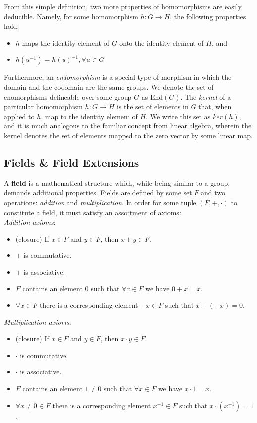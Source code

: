 From this simple definition, two more properties of homomorphisms are easily deducible. Namely, for some homomorphism $h: G \rightarrow H$, the following properties hold:
\begin{itemize}
\item $h$ maps the identity element of $G$ onto the identity element of $H$, and
\item $h(u^{-1}) = h(u)^{-1}, \forall u \in G$
\end{itemize}

Furthermore, an \emph{endomorphism} is a special type of morphism in which the domain and the codomain are the same groups. We denote the set of enomorphisms defineable over some group $G$ as $\text{End}(G)$.
The \emph{kernel} of a particular homomorphism $h: G \rightarrow H$  is the set of elements in $G$ that, when applied to $h$, map to the identity element of $H$. We write this set as $ker(h)$, and it is much analogous to the familiar concept from linear algebra, wherein the kernel denotes the set of elements mapped to the zero vector by some linear map.
\vspace{10mm}

\subsection{Fields \& Field Extensions}

A \textbf{field} is a mathematical structure which, while being similar to a group, demands additional properties. Fields are defined by some set $F$ and two operations: \emph{addition} and \emph{multiplication}. In order for some tuple $(F,+,\cdot)$ to constitute a field, it must satisfy an assortment of axioms:\\

\emph{Addition axioms}:
\begin{itemize}
\item (closure) If $x \in F$ and $y \in F$, then $x + y \in F$.
\item $+$ is commutative.
\item $+$ is associative.
\item $F$ contains an element 0 such that $\forall x \in F$ we have $0 + x = x$.
\item $\forall x \in F$ there is a corresponding element $-x \in F$ such that $x + (-x) = 0$.
\end{itemize}

\emph{Multiplication axioms}:
\begin{itemize}
\item (closure) If $x \in F$ and $y \in F$, then $x \cdot y \in F$.
\item $\cdot$ is commutative.
\item $\cdot$ is associative.
\item $F$ contains an element $1 \neq 0$ such that $\forall x \in F$ we have $x \cdot 1 = x$.
\item $\forall x \neq 0 \in F$ there is a corresponding element $x^{-1} \in F$ such that $x \cdot (x^{-1}) = 1$.
\end{itemize}

